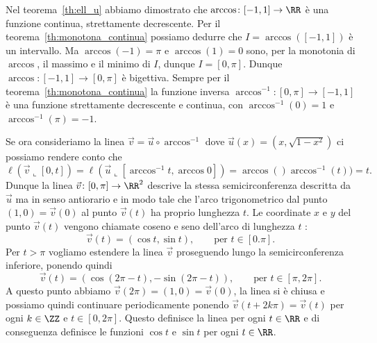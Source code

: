     Nel teorema~\ref{th:ell_u} abbiamo dimostrato che 
    $\arccos\colon [-1,1]\to \RR$ è una funzione 
    continua, strettamente decrescente.
    Per il teorema~\ref{th:monotona_continua}
    possiamo dedurre che $I = \arccos([-1,1])$ è un intervallo.
    Ma $\arccos(-1) = \pi$ e $\arccos(1)=0$ sono, 
    per la monotonia di $\arccos$,
    il massimo e il minimo di $I$, dunque $I=[0,\pi]$.
    Dunque $\arccos\colon [-1,1]\to [0,\pi]$ è bigettiva.
    Sempre per il teorema~\ref{th:monotona_continua}
    la funzione inversa $\arccos^{-1}\colon [0,\pi]\to[-1,1]$
    è una funzione strettamente decrescente e continua, 
    con $\arccos^{-1}(0) = 1$ e $\arccos^{-1}(\pi)=-1$.
    
    Se ora consideriamo la linea $\vec v = \vec u \circ \arccos^{-1}$
    dove $\vec u(x)=(x,\sqrt{1-x^2})$ ci possiamo rendere conto 
    che 
    \[
     \ell(\vec v\llcorner [0,t])  
     = \ell(\vec u\llcorner[\arccos^{-1} t,\arccos 0])
     = \arccos ()\arccos^{-1} (t)) = t.
    \]
    Dunque la linea $\vec v\colon[0,\pi]\to\RR^2$ descrive la stessa
    semicirconferenza descritta da $\vec u$ ma in senso antiorario 
    e in modo tale che l'arco trigonometrico dal punto $(1,0)=\vec v(0)$ 
    al punto $\vec v(t)$ ha proprio lunghezza $t$.
    Le coordinate $x$ e $y$ del punto $\vec v(t)$ vengono chiamate 
    coseno e seno dell'arco di lunghezza $t$%
    :
    \[
      \vec v(t) = (\cos t, \sin t), \qquad\text{per $t\in[0.\pi]$}.  
    \]
    Per $t>\pi$ vogliamo estendere la linea $\vec v$ proseguendo 
    lungo la semicirconferenza inferiore, ponendo quindi 
    \[
      \vec v(t) = (\cos (2\pi - t), -\sin (2\pi - t)), \qquad \text{per $t\in[\pi,2\pi]$}.  
    \]
    A questo punto abbiamo $\vec v(2 \pi) = (1,0) = \vec v(0)$, la linea si è chiusa 
    e possiamo quindi continuare periodicamente ponendo $\vec v(t+2 k \pi) = \vec v(t)$ 
    per ogni $k\in \ZZ$ e $t\in[0,2\pi]$.
    Questo definisce la linea per ogni $t\in \RR$ e di conseguenza 
    definisce le funzioni $\cos t$ e $\sin t$ per ogni $t\in \RR$.
    